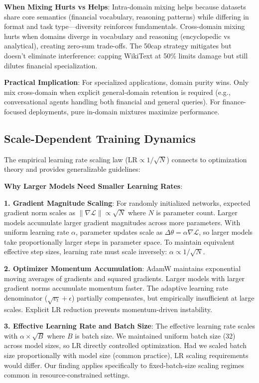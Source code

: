 \textbf{When Mixing Hurts vs Helps}: Intra-domain mixing helps because datasets share core semantics (financial vocabulary, reasoning patterns) while differing in format and task type—diversity reinforces fundamentals. Cross-domain mixing hurts when domains diverge in vocabulary and reasoning (encyclopedic vs analytical), creating zero-sum trade-offs. The 50cap strategy mitigates but doesn't eliminate interference: capping WikiText at 50\% limits damage but still dilutes financial specialization.

\textbf{Practical Implication}: For specialized applications, domain purity wins. Only mix cross-domain when explicit general-domain retention is required (e.g., conversational agents handling both financial and general queries). For finance-focused deployments, pure in-domain mixtures maximize performance.

\subsection{Scale-Dependent Training Dynamics}

The empirical learning rate scaling law ($\text{LR} \propto 1/\sqrt{N}$) connects to optimization theory and provides generalizable guidelines:

\textbf{Why Larger Models Need Smaller Learning Rates}:

\textbf{1. Gradient Magnitude Scaling}: For randomly initialized networks, expected gradient norm scales as $\|\nabla\mathcal{L}\| \propto \sqrt{N}$ where $N$ is parameter count. Larger models accumulate larger gradient magnitudes across more parameters. With uniform learning rate $\alpha$, parameter updates scale as $\Delta\theta = \alpha \nabla\mathcal{L}$, so larger models take proportionally larger steps in parameter space. To maintain equivalent effective step sizes, learning rate must scale inversely: $\alpha \propto 1/\sqrt{N}$.

\textbf{2. Optimizer Momentum Accumulation}: AdamW maintains exponential moving averages of gradients and squared gradients. Larger models with larger gradient norms accumulate momentum faster. The adaptive learning rate denominator ($\sqrt{v_t} + \epsilon$) partially compensates, but empirically insufficient at large scales. Explicit LR reduction prevents momentum-driven instability.

\textbf{3. Effective Learning Rate and Batch Size}: The effective learning rate scales with $\alpha \times \sqrt{B}$ where $B$ is batch size. We maintained uniform batch size (32) across model sizes, so LR directly controlled optimization. Had we scaled batch size proportionally with model size (common practice), LR scaling requirements would differ. Our finding applies specifically to fixed-batch-size scaling regimes common in resource-constrained settings.

